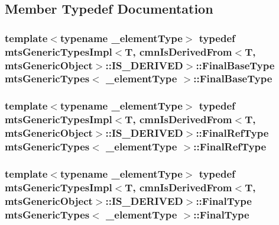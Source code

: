 \subsection{Member Typedef Documentation}
\hypertarget{classmts_generic_types_a8b501ef19a4e81069482410611ef4baf}{
\subsubsection[{Final\-Base\-Type}]{\setlength{\rightskip}{0pt plus 5cm}template$<$typename \-\_\-element\-Type$>$ typedef {\bf mts\-Generic\-Types\-Impl}$<$T, {\bf cmn\-Is\-Derived\-From}$<$T, {\bf mts\-Generic\-Object}$>$\-::I\-S\-\_\-\-D\-E\-R\-I\-V\-E\-D$>$\-::{\bf Final\-Base\-Type} {\bf mts\-Generic\-Types}$<$ \-\_\-element\-Type $>$\-::{\bf Final\-Base\-Type}}}\label{classmts_generic_types_a8b501ef19a4e81069482410611ef4baf}
\hypertarget{classmts_generic_types_a7c2afd28b04e256ba9e64661009c078e}{
\subsubsection[{Final\-Ref\-Type}]{\setlength{\rightskip}{0pt plus 5cm}template$<$typename \-\_\-element\-Type$>$ typedef {\bf mts\-Generic\-Types\-Impl}$<$T, {\bf cmn\-Is\-Derived\-From}$<$T, {\bf mts\-Generic\-Object}$>$\-::I\-S\-\_\-\-D\-E\-R\-I\-V\-E\-D$>$\-::{\bf Final\-Ref\-Type} {\bf mts\-Generic\-Types}$<$ \-\_\-element\-Type $>$\-::{\bf Final\-Ref\-Type}}}\label{classmts_generic_types_a7c2afd28b04e256ba9e64661009c078e}
\hypertarget{classmts_generic_types_a30f6796ebe31d20eda0ee4e874238276}{
\subsubsection[{Final\-Type}]{\setlength{\rightskip}{0pt plus 5cm}template$<$typename \-\_\-element\-Type$>$ typedef {\bf mts\-Generic\-Types\-Impl}$<$T, {\bf cmn\-Is\-Derived\-From}$<$T, {\bf mts\-Generic\-Object}$>$\-::I\-S\-\_\-\-D\-E\-R\-I\-V\-E\-D$>$\-::{\bf Final\-Type} {\bf mts\-Generic\-Types}$<$ \-\_\-element\-Type $>$\-::{\bf Final\-Type}}}\label{classmts_generic_types_a30f6796ebe31d20eda0ee4e874238276}


